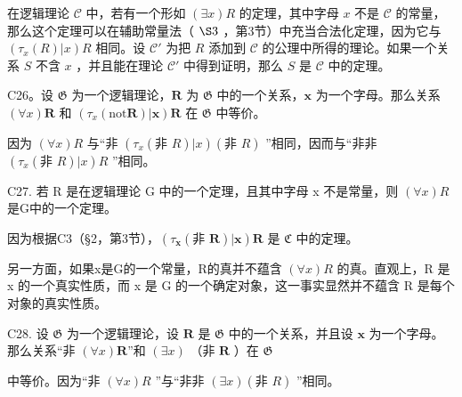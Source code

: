 在逻辑理论 \(\mathcal{C}\) 中，若有一个形如 \((\exists x)R\) 的定理，其中字母 \(x\) 不是 \(\mathcal{C}\) 的常量，那么这个定理可以在辅助常量法（ \(\S 3\) ，第3节）中充当合法化定理，因为它与 \((\tau_{x}(R)|x)R\) 相同。设 \(\mathcal{C}'\) 为把 \(R\) 添加到 \(\mathcal{C}\) 的公理中所得的理论。如果一个关系 \(S\) 不含 \(x\) ，并且能在理论 \(\mathcal{C}'\) 中得到证明，那么 \(S\) 是 \(\mathcal{C}\) 中的定理。

C26。设 \(\mathfrak{G}\) 为一个逻辑理论，\(\pmb{R}\) 为 \(\mathfrak{G}\) 中的一个关系，\(\pmb{x}\) 为一个字母。那么关系 \((\forall x)\pmb{R}\) 和 \((\tau_{x}(\mathrm{not}\pmb{R})|\pmb{x})\pmb{R}\) 在 \(\mathfrak{G}\) 中等价。

因为 \((\forall x)R\) 与“非 \((\tau_{x}(\text{非 } R)|x)(\text{非 } R)\) ”相同，因而与“非非 \((\tau_{x}(\text{非 } R)|x)R\) ”相同。

C27. 若 R 是在逻辑理论 G 中的一个定理，且其中字母 x 不是常量，则 \((\forall x)R\) 是G中的一个定理。

因为根据C3（§2，第3节），\((\tau_{\pmb{x}}(\text{非 } \pmb{R})|\pmb{x})\pmb{R}\) 是 \(\mathfrak{C}\) 中的定理。

另一方面，如果x是G的一个常量，R的真并不蕴含 \((\forall x)R\) 的真。直观上，R 是 x 的一个真实性质，而 x 是 G 的一个确定对象，这一事实显然并不蕴含 R 是每个对象的真实性质。

C28. 设 \(\mathfrak{G}\) 为一个逻辑理论，设 \(\pmb{R}\) 是 \(\mathfrak{G}\) 中的一个关系，并且设 \(\pmb{x}\) 为一个字母。那么关系“非 \((\forall x)\pmb{R}\)”和 \((\exists x)\) （非 \(\pmb{R}\) ）在 \(\mathfrak{G}\)

中等价。因为“非 \((\forall x)R\) ”与“非非 \((\exists x)(\text{非 } R)\) ”相同。

